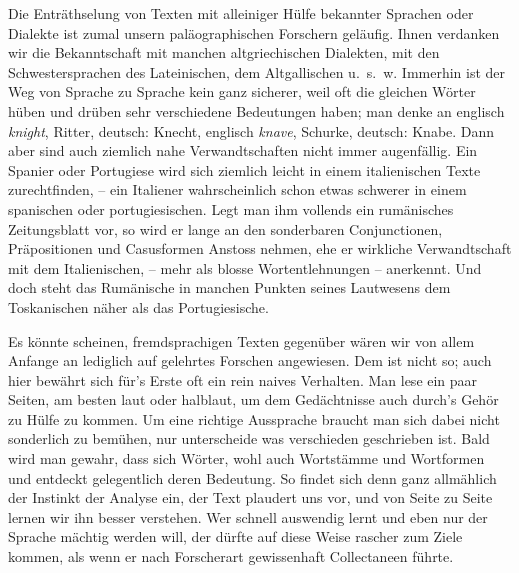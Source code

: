 Die Enträthselung von Texten mit alleiniger Hülfe bekannter Sprachen oder Dialekte ist zumal unsern paläographischen Forschern geläufig. Ihnen verdanken wir die Bekanntschaft mit manchen altgriechischen Dialekten, mit den Schwestersprachen des Lateinischen, dem Altgallischen u.~s.~w. Immerhin ist der Weg von Sprache zu Sprache kein ganz sicherer, weil oft die gleichen Wörter hüben und drüben sehr verschiedene Bedeutungen haben; man denke an englisch \textit{knight}, Ritter, deutsch: Knecht, englisch \textit{knave}, Schurke, deutsch: Knabe. Dann aber sind auch ziemlich nahe Verwandtschaften nicht immer augenfällig. Ein Spanier oder Portugiese wird sich ziemlich leicht in einem italienischen Texte zurechtfinden, – ein Italiener wahrscheinlich schon etwas schwerer in einem spanischen oder portugiesischen. Legt man ihm vollends ein rumänisches Zeitungsblatt vor, so wird er lange an den sonderbaren Conjunctionen, Präpositionen und Casusformen Anstoss nehmen, ehe er wirkliche Verwandtschaft mit dem Italienischen, – mehr als blosse Wortentlehnungen – anerkennt. Und doch steht das Rumänische in manchen Punkten seines Lautwesens dem Toskanischen näher als das Portugiesische.

Es könnte scheinen, fremdsprachigen Texten gegenüber wären wir von allem Anfange an lediglich auf gelehrtes Forschen angewiesen. Dem ist nicht so; auch hier bewährt sich für’s Erste oft ein rein naives Verhalten. Man lese ein paar Seiten, am besten laut oder halblaut, um dem Gedächtnisse auch durch’s Gehör zu Hülfe zu kommen. Um eine richtige Aussprache braucht man sich dabei nicht sonderlich zu bemühen, \label{fp.77} nur unterscheide  was verschieden geschrieben ist. Bald wird man gewahr, dass sich Wörter, wohl auch Wortstämme \label{sp.75} und Wortformen  und entdeckt gelegentlich deren Bedeutung. So findet sich denn ganz allmählich der Instinkt der Analyse ein, der Text plaudert uns vor, und von Seite zu Seite lernen wir ihn besser verstehen. Wer schnell auswendig lernt und eben nur der Sprache mächtig werden will, der dürfte auf diese Weise rascher zum Ziele kommen, als wenn er nach Forscherart gewissenhaft Collectaneen führte. 

